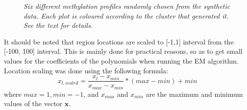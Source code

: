 \begin{figure}[ht!]
\begin{center}
    \end{center}
    \caption{\emph{Six different methylation profiles randomly chosen from the synthetic data. Each plot is coloured according to the cluster that generated it. See the text for details.}}
   \label{meth-prof-pic}
\end{figure}

It should be noted that region locations are scaled to [-1,1] interval from the [-100, 100] interval. This is mainly done for practical reasons, so as to get small values for the coefficients of the polynomials when running the EM algorithm. Location scaling was done using the following formula:
\begin{equation}
	x_{l,scaled} = \frac{x_{l} - x_{min}}{x_{max} - x_{min}} * (max - min) + min
\end{equation}
where $max=1, min=-1$, and $x_{max}$ and $x_{min}$ are the maximum and minimum values of the vector $\mathbf{x}$.